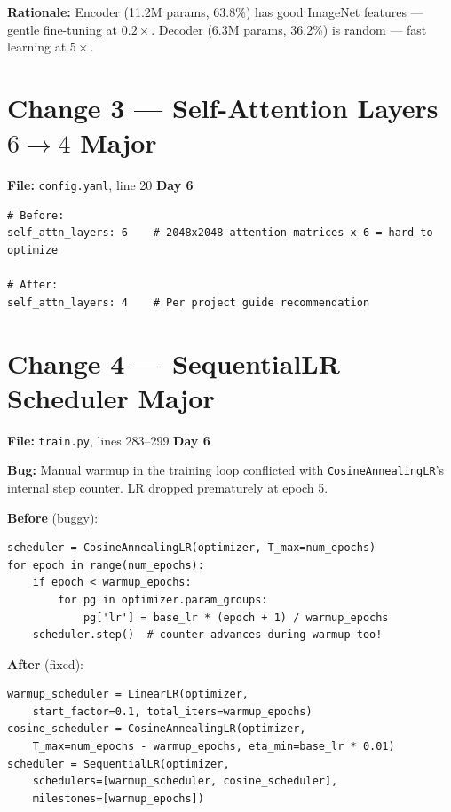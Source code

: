 \documentclass[10pt,a4paper]{article}
\begin{document}
\textbf{Rationale:} Encoder (11.2M params, 63.8\%) has good ImageNet features --- gentle fine-tuning at $0.2\times$. Decoder (6.3M params, 36.2\%) is random --- fast learning at $5\times$.

\section*{Change 3 --- Self-Attention Layers $6 \to 4$ \hfill \normalfont\small Major}

\textbf{File:} \texttt{config.yaml}, line 20 \hfill \textbf{Day 6}

\begin{lstlisting}[style=yaml]
# Before:
self_attn_layers: 6    # 2048x2048 attention matrices x 6 = hard to optimize

# After:
self_attn_layers: 4    # Per project guide recommendation
\end{lstlisting}

\section*{Change 4 --- SequentialLR Scheduler \hfill \normalfont\small Major}

\textbf{File:} \texttt{train.py}, lines 283--299 \hfill \textbf{Day 6}

\textbf{Bug:} Manual warmup in the training loop conflicted with \texttt{CosineAnnealingLR}'s internal step counter. LR dropped prematurely at epoch 5.

\vspace{4pt}
\textbf{Before} \textcolor{bugred}{(buggy)}:
\begin{lstlisting}
scheduler = CosineAnnealingLR(optimizer, T_max=num_epochs)
for epoch in range(num_epochs):
    if epoch < warmup_epochs:
        for pg in optimizer.param_groups:
            pg['lr'] = base_lr * (epoch + 1) / warmup_epochs
    scheduler.step()  # counter advances during warmup too!
\end{lstlisting}

\textbf{After} \textcolor{fixgreen}{(fixed)}:
\begin{lstlisting}
warmup_scheduler = LinearLR(optimizer,
    start_factor=0.1, total_iters=warmup_epochs)
cosine_scheduler = CosineAnnealingLR(optimizer,
    T_max=num_epochs - warmup_epochs, eta_min=base_lr * 0.01)
scheduler = SequentialLR(optimizer,
    schedulers=[warmup_scheduler, cosine_scheduler],
    milestones=[warmup_epochs])
\end{lstlisting}
\end{document}
